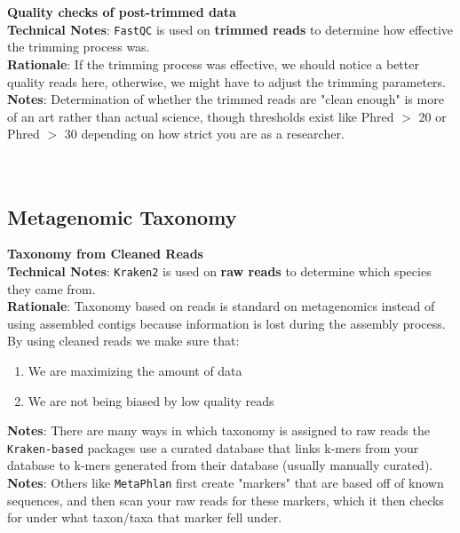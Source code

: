 \documentclass[11pt]{report}
\begin{document}
\\\\
\textbf{Quality checks of post-trimmed data} 
\\ \textbf{Technical Notes}: \texttt{FastQC} is used on \textbf{trimmed reads} to determine how effective the trimming process was. 
\\ \textbf{Rationale}: If the trimming process was effective, we should notice a better quality reads here, otherwise, we might have to adjust the trimming parameters. 
\\ \textbf{Notes}: Determination of whether the trimmed reads are "clean enough" is more of an art rather than actual science, though thresholds exist like Phred $>$ 20 or Phred $>$ 30 depending on how strict you are as a researcher. \\
\\ 
\\

\subsection*{Metagenomic Taxonomy}	
\textbf{Taxonomy from Cleaned Reads} 
\\ \textbf{Technical Notes}: \texttt{Kraken2} is used on \textbf{raw reads} to determine which species they came from. 
\\ \textbf{Rationale}: Taxonomy based on reads is standard on metagenomics instead of using assembled contigs because information is lost during the assembly process. By using cleaned reads we make sure that: 
	 \begin{enumerate}
	 	\item We are maximizing the amount of data
	 	\item We are not being biased by low quality reads
	 \end{enumerate}
\textbf{Notes}: There are many ways in which taxonomy is assigned to raw reads the \texttt{Kraken-based} packages use a curated database that links k-mers from your database to k-mers generated from their database (usually manually curated).  
\\ \textbf{Notes}: Others like \texttt{MetaPhlan} first create "markers" that are based off of known sequences, and then scan your raw reads for these markers, which it then checks for under what taxon/taxa that marker fell under. \\
\end{document}

